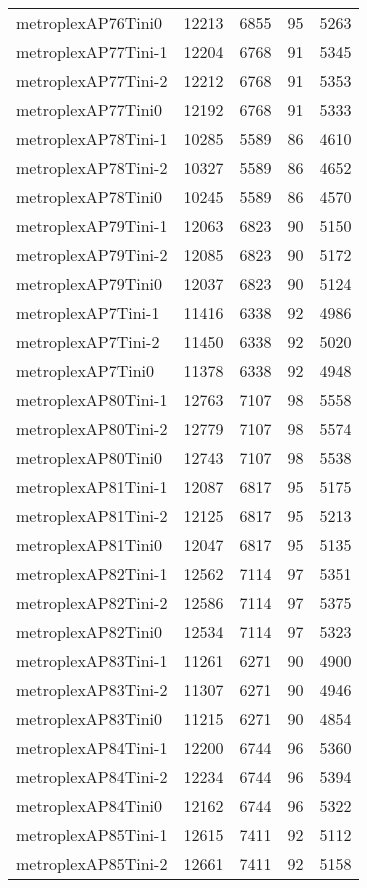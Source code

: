 \begin{longtable}{lrrrr}
metroplexAP76Tini0 & 12213 & 6855 & 95 & 5263 \\
metroplexAP77Tini-1 & 12204 & 6768 & 91 & 5345 \\
metroplexAP77Tini-2 & 12212 & 6768 & 91 & 5353 \\
metroplexAP77Tini0 & 12192 & 6768 & 91 & 5333 \\
metroplexAP78Tini-1 & 10285 & 5589 & 86 & 4610 \\
metroplexAP78Tini-2 & 10327 & 5589 & 86 & 4652 \\
metroplexAP78Tini0 & 10245 & 5589 & 86 & 4570 \\
metroplexAP79Tini-1 & 12063 & 6823 & 90 & 5150 \\
metroplexAP79Tini-2 & 12085 & 6823 & 90 & 5172 \\
metroplexAP79Tini0 & 12037 & 6823 & 90 & 5124 \\
metroplexAP7Tini-1 & 11416 & 6338 & 92 & 4986 \\
metroplexAP7Tini-2 & 11450 & 6338 & 92 & 5020 \\
metroplexAP7Tini0 & 11378 & 6338 & 92 & 4948 \\
metroplexAP80Tini-1 & 12763 & 7107 & 98 & 5558 \\
metroplexAP80Tini-2 & 12779 & 7107 & 98 & 5574 \\
metroplexAP80Tini0 & 12743 & 7107 & 98 & 5538 \\
metroplexAP81Tini-1 & 12087 & 6817 & 95 & 5175 \\
metroplexAP81Tini-2 & 12125 & 6817 & 95 & 5213 \\
metroplexAP81Tini0 & 12047 & 6817 & 95 & 5135 \\
metroplexAP82Tini-1 & 12562 & 7114 & 97 & 5351 \\
metroplexAP82Tini-2 & 12586 & 7114 & 97 & 5375 \\
metroplexAP82Tini0 & 12534 & 7114 & 97 & 5323 \\
metroplexAP83Tini-1 & 11261 & 6271 & 90 & 4900 \\
metroplexAP83Tini-2 & 11307 & 6271 & 90 & 4946 \\
metroplexAP83Tini0 & 11215 & 6271 & 90 & 4854 \\
metroplexAP84Tini-1 & 12200 & 6744 & 96 & 5360 \\
metroplexAP84Tini-2 & 12234 & 6744 & 96 & 5394 \\
metroplexAP84Tini0 & 12162 & 6744 & 96 & 5322 \\
metroplexAP85Tini-1 & 12615 & 7411 & 92 & 5112 \\
metroplexAP85Tini-2 & 12661 & 7411 & 92 & 5158 \\

\end{longtable}
